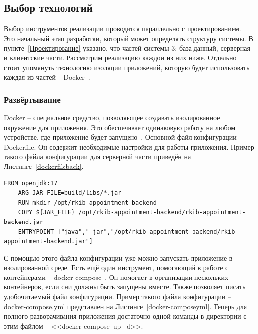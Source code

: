 \documentclass[a4paper,article]{article}
\begin{document}
\begin{sloppypar}
    \subsection{Выбор технологий}\label{Реализация. Выбор}

    Выбор инструментов реализации проводится параллельно с проектированием. Это начальный этап разработки, который может определять структуру системы. В пункте~\ref{Проектирование} указано, что частей системы 3: база данный, серверная и клиентские части. Рассмотрим реализацию каждой из них ниже. Отдельно стоит упомянуть технологию изоляции приложений, которую будет использовать каждая из частей -- Docker~\cite{dockerdoc}.

    \subsubsection{Развёртывание}\label{Реализация. Выбор. Докер}

    Docker -- специальное средство, позволяющее создавать изолированное окружение для приложения. Это обеспечивает одинаковую работу на любом устройстве, где приложение будет запущено~\cite{dockerdoc}. Основной файл конфигурации -- Dockerfile. Он содержит необходимые настройки для работы приложения. Пример такого файла конфигурации для серверной части приведён на Листинге~\ref{dockerfileback}.

    \begin{lstlisting}[label=dockerfileback,caption=Пример Dockerfile для бекенда]
    FROM openjdk:17
    ARG JAR_FILE=build/libs/*.jar
    RUN mkdir /opt/rkib-appointment-backend
    COPY ${JAR_FILE} /opt/rkib-appointment-backend/rkib-appointment-backend.jar
    ENTRYPOINT ["java","-jar","/opt/rkib-appointment-backend/rkib-appointment-backend.jar"]
    \end{lstlisting}

    С помощью этого файла конфигурации уже можно запускать приложение в изолированной среде. Есть ещё один инструмент, помогающий в работе с контейнерами -- docker-compose~\cite{dockerdoc}. Он помогает в организации нескольких контейнеров, если они должны быть запущены вместе. Также позволяет писать удобочитаемый файл конфигурации. Пример такого файла конфигурации -- docker-compose.yml представлен на Листинге~\ref{docker-composeyml}. Теперь для полного разворачивания приложения достаточно одной команды в директории с этим файлом -- <<docker-compose~up~-d>>.


\end{sloppypar}
\end{document}
